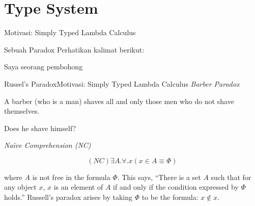 \documentclass[aspectratio=1610,10pt,handout]{beamer}
\begin{document}
\section{Type System}

	\begin{frame}{Motivasi: Simply Typed Lambda Calculus }{}
		\begin{block}{Sebuah Paradox}
			Perhatikan kalimat berikut:
			\pause

			{\LARGE {\center
				\alert{Saya seorang pembohong}
			}}
		\end{block}
	\end{frame}


	\begin{frame}{Russel's Paradox}{Motivasi: Simply Typed Lambda Calculus }
		{\it Barber Paradox} \vspace{1cm}

		{\Large  A barber (who is a man) shaves all and only those men who do not shave themselves.

			\vspace{1cm}
			Does he shave himself?}

		\pause
		\vspace{1cm}
		{\it Na\"ive Comprehension (NC)}

		$$(NC) \exists A . \forall . x (x \in A \equiv  \Phi )$$

		where $A$ is not free in the formula $\Phi$. This says, “There is a set $A$ such that for any object $x$, $x$ is an element of $A$ if and only if the condition expressed by $\Phi$ holds.” Russell’s paradox arises by taking $\Phi$  to be the formula: $x \notin x$.

	\end{frame}

\end{document}
